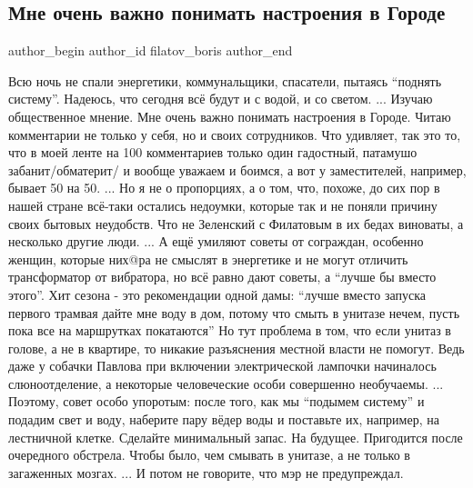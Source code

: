  
 
 
 
 
 
\subsection{Мне очень важно понимать настроения в Городе}
\label{sec:24_11_2022.fb.filatov_boris.2.nastroenia_v_gorode}
 
\ifcmt
 author_begin
   author_id filatov_boris
 author_end
\fi

\obeycr
Всю ночь не спали энергетики, коммунальщики, спасатели, пытаясь \enquote{поднять систему}.
Надеюсь, что сегодня всё будут и с водой, и со светом.
...
Изучаю общественное мнение. 
Мне очень важно понимать настроения в Городе.
Читаю комментарии не только у себя, но и своих сотрудников.
Что удивляет, так это то, что в моей ленте на 100 комментариев только один гадостный, патамушо забанит/обматерит/ и вообще уважаем и боимся, а вот у заместителей, например, бывает 50 на 50.
...
Но я не о пропорциях, а о том, что, похоже, до сих пор в нашей стране всё-таки остались недоумки, которые так и не поняли причину своих бытовых неудобств.
Что не Зеленский с Филатовым в их бедах виноваты, а несколько другие люди.
...
А ещё умиляют советы от сограждан, особенно женщин, которые них@ра не смыслят в энергетике и не могут отличить трансформатор от вибратора, но всё равно дают советы, а \enquote{лучше бы вместо этого}.
Хит сезона - это рекомендации одной дамы: \enquote{лучше вместо запуска первого трамвая дайте мне воду в дом, потому что смыть в унитазе нечем, пусть пока все на маршрутках покатаются}
Но тут проблема в том, что если унитаз в голове, а не в квартире, то никакие разъяснения местной власти не помогут.
Ведь даже у собачки Павлова при включении электрической лампочки начиналось слюноотделение, а некоторые человеческие особи совершенно необучаемы.
...
Поэтому, совет особо упоротым: после того, как мы \enquote{подымем систему} и подадим свет и воду, наберите пару вёдер воды и поставьте их, например, на лестничной клетке.
Сделайте минимальный запас.
На будущее.
Пригодится после очередного обстрела.
Чтобы было, чем смывать в унитазе, а не только в загаженных мозгах.
...
И потом не говорите, что мэр не предупреждал.
\restorecr

